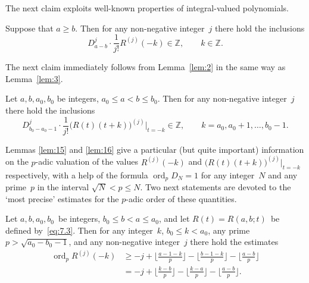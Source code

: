 \documentclass[a4paper,twoside]{article}
\numberwithin{equation}{section}
\renewcommand{\[}{\lfloor}
\renewcommand{\]}{\rfloor}
\newcommand{\<}{\langle}
\renewcommand{\>}{\rangle}
\DeclareMathOperator{\ord}{ord}
\newcommand{\rom}[1]{{\rm#1}}
\begin{document}
The next claim exploits well-known properties of integral-valued
polynomials.

\begin{lemma}
\label{lem:15}
Suppose that $a\ge b$. Then for any non-negative integer~$j$
there hold the inclusions
$$
D_{a-b}^j\cdot\frac1{j!}R^{(j)}(-k)\in\mathbb Z, \qquad k\in\mathbb Z.
$$
\end{lemma}

The next claim immediately follows from Lemma~\ref{lem:2}
in the same way as Lemma~\ref{lem:3}.

\begin{lemma}
\label{lem:16}
Let $a,b,a_0,b_0$ be integers, $a_0\le a<b\le b_0$.
Then for any non-negative integer~$j$
there hold the inclusions
$$
D_{b_0-a_0-1}^j\cdot\frac1{j!}\bigl(R(t)(t+k)\bigr)^{(j)}\big|_{t=-k}
\in\mathbb Z,
\qquad k=a_0,a_0+1,\dots,b_0-1.
$$
\end{lemma}

Lemmas \ref{lem:15} and \ref{lem:16}
give a particular (but quite important)
information on the $p$-adic valuation of the values
$R^{(j)}(-k)$ and $\bigl(R(t)(t+k)\bigr)^{(j)}\big|_{t=-k}$
respectively, with a help of the formula
$\ord_pD_N=1$ for any integer~$N$ and any prime~$p$
in the interval $\sqrt N<p\le N$.
Two next statements are devoted to
the `most precise' estimates for the $p$-adic order
of these quantities.

\begin{lemma}
\label{lem:17}
Let $a,b,a_0,b_0$~be integers\rom, $b_0\le b<a\le a_0$\rom, and
let $R(t)=R(a,b;t)$~be defined by~\eqref{eq:7.3}.
Then for any integer~$k$\rom, $b_0\le k<a_0$\rom,
any prime $p>\sqrt{a_0-b_0-1}$\rom, and any non-negative integer~$j$
there hold the estimates
\begin{align}
\ord_pR^{(j)}(-k)
&\ge-j+\biggl\[\frac{a-1-k}p\biggr\]
-\biggl\[\frac{b-1-k}p\biggr\]-\biggl\[\frac{a-b}p\biggr\]
\nonumber\\
&=-j+\biggl\[\frac{k-b}p\biggr\]
-\biggl\[\frac{k-a}p\biggr\]-\biggl\[\frac{a-b}p\biggr\].
\label{eq:7.4}
\end{align}
\end{lemma}
\end{document}

